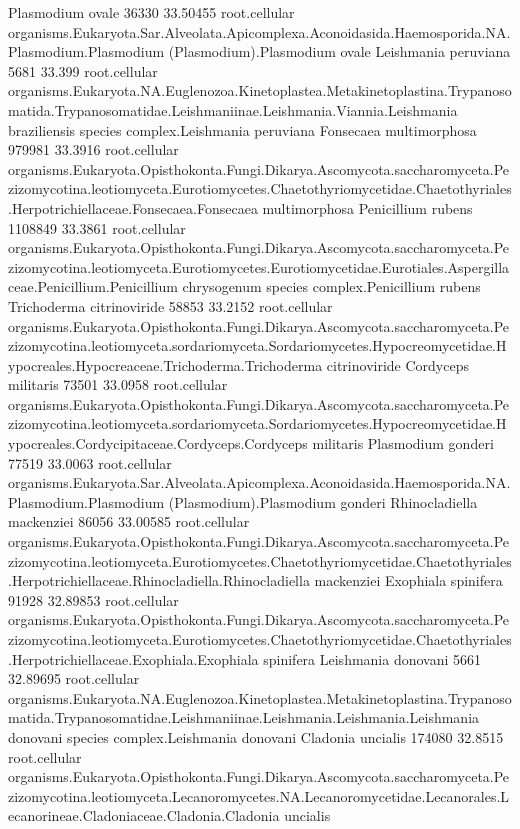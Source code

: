 \documentclass{article}
\begin{document}
\begin{Schunk}
\begin{Soutput}
 Plasmodium ovale 		 36330 33.50455 	 root.cellular organisms.Eukaryota.Sar.Alveolata.Apicomplexa.Aconoidasida.Haemosporida.NA.Plasmodium.Plasmodium (Plasmodium).Plasmodium ovale
 Leishmania peruviana 		 5681 33.399 	 root.cellular organisms.Eukaryota.NA.Euglenozoa.Kinetoplastea.Metakinetoplastina.Trypanosomatida.Trypanosomatidae.Leishmaniinae.Leishmania.Viannia.Leishmania braziliensis species complex.Leishmania peruviana
 Fonsecaea multimorphosa 		 979981 33.3916 	 root.cellular organisms.Eukaryota.Opisthokonta.Fungi.Dikarya.Ascomycota.saccharomyceta.Pezizomycotina.leotiomyceta.Eurotiomycetes.Chaetothyriomycetidae.Chaetothyriales.Herpotrichiellaceae.Fonsecaea.Fonsecaea multimorphosa
 Penicillium rubens 		 1108849 33.3861 	 root.cellular organisms.Eukaryota.Opisthokonta.Fungi.Dikarya.Ascomycota.saccharomyceta.Pezizomycotina.leotiomyceta.Eurotiomycetes.Eurotiomycetidae.Eurotiales.Aspergillaceae.Penicillium.Penicillium chrysogenum species complex.Penicillium rubens
 Trichoderma citrinoviride 		 58853 33.2152 	 root.cellular organisms.Eukaryota.Opisthokonta.Fungi.Dikarya.Ascomycota.saccharomyceta.Pezizomycotina.leotiomyceta.sordariomyceta.Sordariomycetes.Hypocreomycetidae.Hypocreales.Hypocreaceae.Trichoderma.Trichoderma citrinoviride
 Cordyceps militaris 		 73501 33.0958 	 root.cellular organisms.Eukaryota.Opisthokonta.Fungi.Dikarya.Ascomycota.saccharomyceta.Pezizomycotina.leotiomyceta.sordariomyceta.Sordariomycetes.Hypocreomycetidae.Hypocreales.Cordycipitaceae.Cordyceps.Cordyceps militaris
 Plasmodium gonderi 		 77519 33.0063 	 root.cellular organisms.Eukaryota.Sar.Alveolata.Apicomplexa.Aconoidasida.Haemosporida.NA.Plasmodium.Plasmodium (Plasmodium).Plasmodium gonderi
 Rhinocladiella mackenziei 		 86056 33.00585 	 root.cellular organisms.Eukaryota.Opisthokonta.Fungi.Dikarya.Ascomycota.saccharomyceta.Pezizomycotina.leotiomyceta.Eurotiomycetes.Chaetothyriomycetidae.Chaetothyriales.Herpotrichiellaceae.Rhinocladiella.Rhinocladiella mackenziei
 Exophiala spinifera 		 91928 32.89853 	 root.cellular organisms.Eukaryota.Opisthokonta.Fungi.Dikarya.Ascomycota.saccharomyceta.Pezizomycotina.leotiomyceta.Eurotiomycetes.Chaetothyriomycetidae.Chaetothyriales.Herpotrichiellaceae.Exophiala.Exophiala spinifera
 Leishmania donovani 		 5661 32.89695 	 root.cellular organisms.Eukaryota.NA.Euglenozoa.Kinetoplastea.Metakinetoplastina.Trypanosomatida.Trypanosomatidae.Leishmaniinae.Leishmania.Leishmania.Leishmania donovani species complex.Leishmania donovani
 Cladonia uncialis 		 174080 32.8515 	 root.cellular organisms.Eukaryota.Opisthokonta.Fungi.Dikarya.Ascomycota.saccharomyceta.Pezizomycotina.leotiomyceta.Lecanoromycetes.NA.Lecanoromycetidae.Lecanorales.Lecanorineae.Cladoniaceae.Cladonia.Cladonia uncialis

\end{Soutput}
\end{Schunk}
\end{document}
